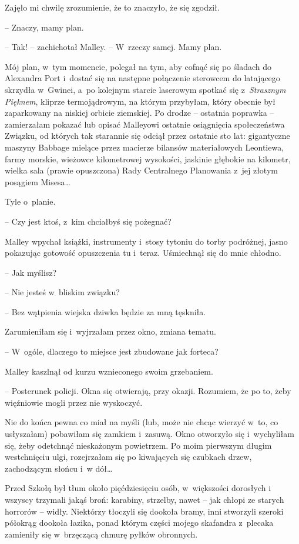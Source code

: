 \documentclass[oneside,polish,11pt,sfheadings]{mwbk}
\begin{document}
Zajęło mi chwilę zrozumienie, że to znaczyło, że się zgodził.

-- Znaczy, mamy plan.

-- Tak! -- zachichotał Malley. -- W~rzeczy samej. Mamy plan.

Mój plan, w~tym momencie, polegał na tym, aby cofnąć się po śladach do
Alexandra Port i~dostać się na następne połączenie sterowcem do
latającego skrzydła w~Gwinei, a~po kolejnym starcie laserowym spotkać
się z~\textit{Strasznym Pięknem}, kliprze termojądrowym, na którym
przybyłam, który obecnie był zaparkowany na niskiej orbicie ziemskiej.
Po drodze -- ostatnia poprawka -- zamierzałam pokazać lub opisać Malleyowi
ostatnie osiągnięcia społeczeństwa Związku, od których tak starannie się
odciął przez ostatnie sto lat: gigantyczne maszyny Babbage mielące przez
macierze bilansów materiałowych Leontiewa, farmy morskie, wieżowce
kilometrowej wysokości, jaskinie głębokie na kilometr, wielka sala
(prawie opuszczona) Rady Centralnego Planowania z~jej złotym posągiem
Misesa\ldots 

Tyle o~planie.

-- Czy jest ktoś, z~kim chciałbyś się pożegnać?

Malley wpychał książki, instrumenty i~stosy tytoniu do torby podróżnej,
jasno pokazując gotowość opuszczenia tu i~teraz. Uśmiechnął się do mnie
chłodno.

-- Jak myślisz?

-- Nie jesteś w~bliskim związku?

-- Bez wątpienia wiejska dziwka będzie za mną tęskniła.

Zarumieniłam się i~wyjrzałam przez okno, zmiana tematu.

-- W~ogóle, dlaczego to miejsce jest zbudowane jak forteca?

Malley kaszlnął od kurzu wznieconego swoim grzebaniem.

-- Posterunek policji. Okna się otwierają, przy okazji. Rozumiem, że po
to, żeby więźniowie mogli przez nie wyskoczyć.

Nie do końca pewna co miał na myśli (lub, może nie chcąc wierzyć w~to,
co usłyszałam) pobawiłam się zamkiem i~zasuwą. Okno otworzyło się i~wychyliłam się, żeby odetchnąć nieskażonym powietrzem. Po moim pierwszym
długim westchnięciu ulgi, rozejrzałam się po kiwających się czubkach
drzew, zachodzącym słońcu i~w dół\ldots 

Przed Szkołą był tłum około pięćdziesięciu osób, w~większości dorosłych
i wszyscy trzymali jakąś broń: karabiny, strzelby, nawet -- jak chłopi ze
starych horrorów -- widły. Niektórzy tłoczyli się dookoła bramy, inni
stworzyli szeroki półokrąg dookoła łazika, ponad którym części mojego
skafandra z~plecaka zamieniły się w~brzęczącą chmurę pyłków obronnych.
\end{document}
